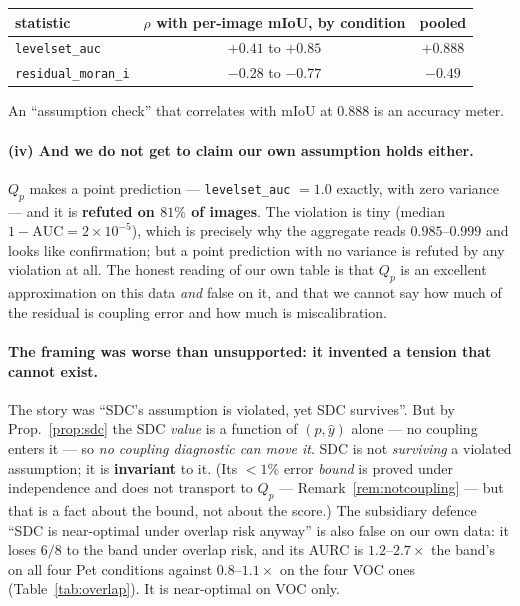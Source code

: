 \documentclass[11pt]{article}
\theoremstyle{remark}
\begin{document}
\begin{center}
\small
\begin{tabular}{lcc}
\toprule
statistic & $\rho$ with per-image mIoU, by condition & pooled \\
\midrule
\texttt{levelset\_auc}      & $+0.41$ to $+0.85$ & $\mathbf{+0.888}$ \\
\texttt{residual\_moran\_i} & $-0.28$ to $-0.77$ & $\mathbf{-0.49}$ \\
\bottomrule
\end{tabular}
\end{center}

An ``assumption check'' that correlates with mIoU at $0.888$ is an accuracy meter.

\paragraph{(iv) And we do not get to claim our own assumption holds either.} $Q_p$ makes
a point prediction --- \texttt{levelset\_auc} $=1.0$ exactly, with zero variance --- and
it is \textbf{refuted on $81\%$ of images}. The violation is tiny (median
$1-\mathrm{AUC} = 2\times 10^{-5}$), which is precisely why the aggregate reads
$0.985$--$0.999$ and looks like confirmation; but a point prediction with no variance is
refuted by any violation at all. The honest reading of our own table is that $Q_p$ is an
excellent approximation on this data \emph{and} false on it, and that we cannot say how
much of the residual is coupling error and how much is miscalibration.

\paragraph{The framing was worse than unsupported: it invented a tension that cannot
exist.} The story was ``SDC's assumption is violated, yet SDC survives''. But by
Prop.~\ref{prop:sdc} the SDC \emph{value} is a function of $(p,\hat y)$ alone --- no
coupling enters it --- so \emph{no coupling diagnostic can move it}. SDC is not
\emph{surviving} a violated assumption; it is \textbf{invariant} to it. (Its $<\!1\%$
error \emph{bound} is proved under independence and does not transport to $Q_p$ ---
Remark~\ref{rem:notcoupling} --- but that is a fact about the bound, not about the
score.) The subsidiary defence ``SDC is near-optimal under overlap risk anyway'' is also
false on our own data: it loses $6/8$ to the band under overlap risk, and its AURC is
$1.2$--$2.7\times$ the band's on all four Pet conditions against $0.8$--$1.1\times$ on
the four VOC ones (Table~\ref{tab:overlap}). It is near-optimal on VOC only.
\end{document}
